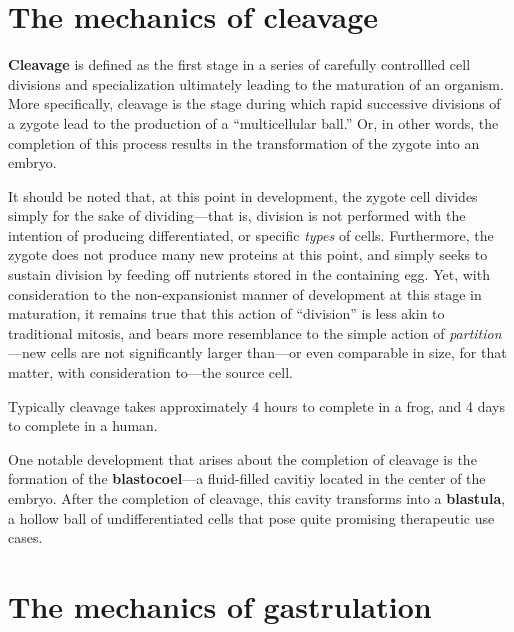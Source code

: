 \documentclass{article}
\begin{document}
\section{The mechanics of cleavage}

\textbf{Cleavage} is defined as the first stage in a series of carefully
controllled cell divisions and specialization ultimately leading to the
maturation of an organism. More specifically, cleavage is the stage
during which rapid successive divisions of a zygote lead to the production
of a ``multicellular ball.'' Or, in other words, the completion of this
process results in the transformation of the zygote into an embryo.

It should be noted that, at this point in development, the zygote cell
divides simply for the sake of dividing---that is, division is not performed
with the intention of producing differentiated, or specific \emph{types}
of cells. Furthermore, the zygote does not produce many new proteins at this
point, and simply seeks to sustain division by feeding off nutrients stored in
the containing egg. Yet, with consideration to the non-expansionist manner of
development at this stage in maturation, it remains true that this action of
``division'' is less akin to traditional mitosis, and bears more resemblance
to the simple action of \emph{partition}---new cells are not significantly
larger than---or even comparable in size, for that matter, with consideration
to---the source cell.

Typically cleavage takes approximately 4 hours to complete in a frog, and 4
days to complete in a human.

One notable development that arises about the completion of cleavage is the
formation of the \textbf{blastocoel}---a fluid-filled cavitiy located in the
center of the embryo. After the completion of cleavage, this cavity transforms
into a \textbf{blastula}, a hollow ball of undifferentiated cells that pose
quite promising therapeutic use cases.

\section{The mechanics of gastrulation}
\end{document}
